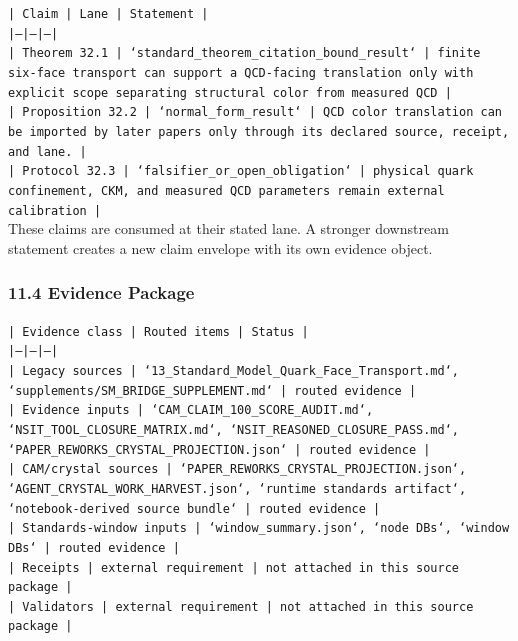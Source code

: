 \documentclass[11pt]{article}
\begin{document}
\noindent\texttt{| Claim | Lane | Statement |}\\
\noindent\texttt{|---|---|---|}\\
\noindent\texttt{| Theorem 32.1 | `standard\_theorem\_citation\_bound\_result` | finite six-face transport can support a QCD-facing translation only with explicit scope separating structural color from measured QCD |}\\
\noindent\texttt{| Proposition 32.2 | `normal\_form\_result` | QCD color translation can be imported by later papers only through its declared source, receipt, and lane. |}\\
\noindent\texttt{| Protocol 32.3 | `falsifier\_or\_open\_obligation` | physical quark confinement, CKM, and measured QCD parameters remain external calibration |}\\

These claims are consumed at their stated lane. A stronger downstream statement
creates a new claim envelope with its own evidence object.

\subsubsection*{11.4 Evidence Package}

\noindent\texttt{| Evidence class | Routed items | Status |}\\
\noindent\texttt{|---|---|---|}\\
\noindent\texttt{| Legacy sources | `13\_Standard\_Model\_Quark\_Face\_Transport.md`, `supplements/SM\_BRIDGE\_SUPPLEMENT.md` | routed evidence |}\\
\noindent\texttt{| Evidence inputs | `CAM\_CLAIM\_100\_SCORE\_AUDIT.md`, `NSIT\_TOOL\_CLOSURE\_MATRIX.md`, `NSIT\_REASONED\_CLOSURE\_PASS.md`, `PAPER\_REWORKS\_CRYSTAL\_PROJECTION.json` | routed evidence |}\\
\noindent\texttt{| CAM/crystal sources | `PAPER\_REWORKS\_CRYSTAL\_PROJECTION.json`, `AGENT\_CRYSTAL\_WORK\_HARVEST.json`, `runtime standards artifact`, `notebook-derived source bundle` | routed evidence |}\\
\noindent\texttt{| Standards-window inputs | `window\_summary.json`, `node DBs`, `window DBs` | routed evidence |}\\
\noindent\texttt{| Receipts | external requirement | not attached in this source package |}\\
\noindent\texttt{| Validators | external requirement | not attached in this source package |}\\
\end{document}

